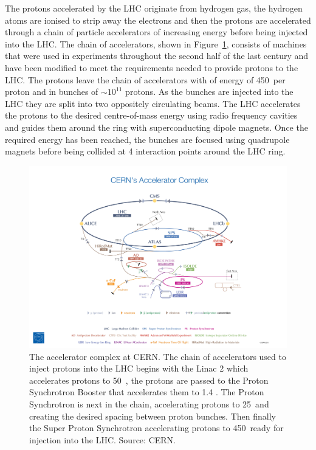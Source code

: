 The protons accelerated by the LHC originate from hydrogen gas, %
the hydrogen atoms are ionised to strip away the electrons and then the protons are accelerated through a chain of particle accelerators of increasing energy before being injected into the LHC. The chain of accelerators, shown in Figure~\ref{fig:accelerator_chain}, consists of machines that were used in experiments throughout the second half of the last century and have been modified to meet the requirements needed to provide protons to the LHC. The protons leave the chain of accelerators with of energy of 450~\gev per proton and in bunches of $\sim 10^{11}$ protons. As the bunches are injected into the LHC they are split into two oppositely circulating beams.
The LHC accelerates the protons to the desired centre-of-mass energy using radio frequency cavities and guides them around the ring with superconducting dipole magnets. %
Once the required energy has been reached, the bunches are focused using quadrupole magnets before being collided at 4 interaction points around the LHC ring.%

\begin{figure}[htbp!]
  \centering
  \includegraphics[trim = 125mm 2mm 125mm 90mm, clip, width=1.2\textwidth]{./Figs/LHC_LHCb/accelerator_complex.jpg}
  \caption{The accelerator complex at CERN. The chain of accelerators used to inject protons into the LHC begins with the Linac 2 which accelerates protons to 50~\mev, the protons are passed to the Proton Synchrotron Booster that accelerates them to 1.4 \gev. The Proton Synchrotron is next in the chain, accelerating protons to 25~\gev and creating the desired spacing between proton bunches. Then finally the Super Proton Synchrotron accelerating protons to 450~\gev ready for injection into the LHC. Source: CERN.}
  \label{fig:accelerator_chain}
\end{figure}



